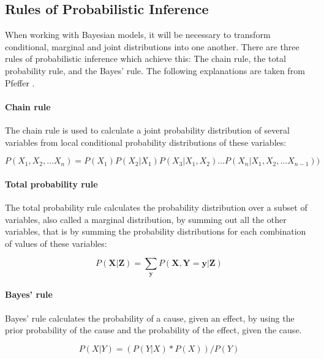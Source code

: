 \documentclass{article}
\begin{document}
\begin{appendices}
\section{Rules of Probabilistic Inference}
\label{appendix:Rules of Probabilistic Inference}

When working with Bayesian models, it will be necessary to transform conditional, marginal and joint distributions into one another. There are three rules of probabilistic inference which achieve this: The chain rule, the total probability rule, and the Bayes' rule. The following explanations are taken from Pfeffer \cite{9781617292330}.

\paragraph{Chain rule}

The chain rule is used to calculate a \gls{joint probability distribution} of several variables from local \gls{conditional probability distribution}s of these variables:

\begin{equation}
P(X_1 ,X_2 ,...X_n ) = P(X_1 )P(X_2 | X_1 )P(X_3 | X_1 ,X_2 )...P(X_n | X_1 ,X_2 ,...X_{n-1}) )
\end{equation}

\paragraph{Total probability rule}

The total probability rule calculates the probability distribution over a subset of variables, also called a \gls{marginal distribution}, by summing out all the other variables, that is by summing the probability distributions for each combination of values of these variables:

\begin{equation}
P(\boldsymbol X |\boldsymbol Z ) = \sum_{\boldsymbol y}   P(\boldsymbol X ,\boldsymbol Y =\boldsymbol y |\boldsymbol Z )
\end{equation} 

\paragraph{Bayes' rule}

Bayes' rule calculates the probability of a cause, given an effect, by using the prior probability of the cause and the probability of the effect, given the cause. 

\begin{equation}
P(X|Y) = ( P(Y|X) * P(X) ) / P(Y)
\end{equation}
\end{appendices}
	
\end{document}
